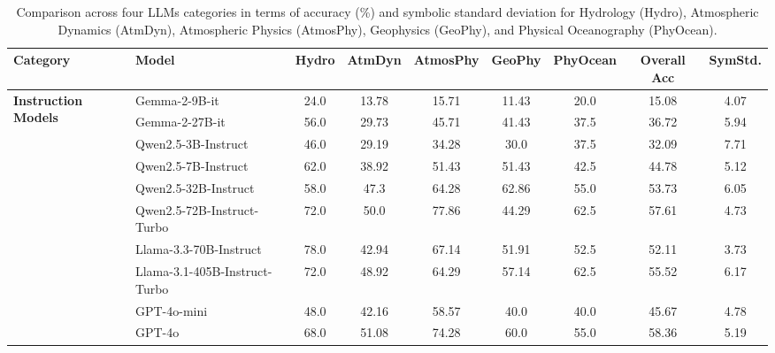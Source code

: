\begin{table*}[ht]
    \caption{Comparison across four LLMs categories in terms of accuracy (\%) and symbolic standard deviation for Hydrology (Hydro), Atmospheric Dynamics (AtmDyn), Atmospheric Physics (AtmosPhy), Geophysics (GeoPhy), and Physical Oceanography (PhyOcean).}
    \label{tab:model_comparison}
    \centering
    \large
    \begin{adjustbox}{max width=\textwidth}
    \begin{tabular}{l l c c c c c | c c}
        \toprule
        \textbf{Category} & \textbf{Model} & \textbf{Hydro} & \textbf{AtmDyn} & \textbf{AtmosPhy} & \textbf{GeoPhy} & \textbf{PhyOcean} & \textbf{Overall Acc} & \textbf{SymStd.} \\
        \midrule
        \multirow{12}{*}{\textbf{Instruction Models}} 
        & Gemma-2-9B-it & 24.0 & 13.78 & 15.71 & 11.43 & 20.0 & 15.08 & 4.07 \\
        & \cellcolor{skyblue}Gemma-2-27B-it & \cellcolor{skyblue}56.0 & \cellcolor{skyblue}29.73 & \cellcolor{skyblue}45.71 & \cellcolor{skyblue}41.43 & \cellcolor{skyblue}37.5 & \cellcolor{skyblue}36.72 & \cellcolor{skyblue}5.94 \\
        & Qwen2.5-3B-Instruct & 46.0 & 29.19 & 34.28 & 30.0 & 37.5 & 32.09 & 7.71 \\
        & \cellcolor{skyblue}Qwen2.5-7B-Instruct & \cellcolor{skyblue}62.0 & \cellcolor{skyblue}38.92 & \cellcolor{skyblue}51.43 & \cellcolor{skyblue}51.43 & \cellcolor{skyblue}42.5 & \cellcolor{skyblue}44.78 & \cellcolor{skyblue}5.12 \\
        & Qwen2.5-32B-Instruct & 58.0 & 47.3 & 64.28 & 62.86 & 55.0 & 53.73 & 6.05 \\
        & \cellcolor{skyblue}Qwen2.5-72B-Instruct-Turbo & \cellcolor{skyblue}72.0 & \cellcolor{skyblue}50.0 & \cellcolor{skyblue}77.86 & \cellcolor{skyblue}44.29 & \cellcolor{skyblue}62.5 & \cellcolor{skyblue}57.61 & \cellcolor{skyblue}4.73 \\
        & Llama-3.3-70B-Instruct & 78.0 & 42.94 & 67.14 & 51.91 & 52.5 & 52.11 & 3.73 \\
        & \cellcolor{skyblue}Llama-3.1-405B-Instruct-Turbo & \cellcolor{skyblue}72.0 & \cellcolor{skyblue}48.92 & \cellcolor{skyblue}64.29 & \cellcolor{skyblue}57.14 & \cellcolor{skyblue}62.5 & \cellcolor{skyblue}55.52 & \cellcolor{skyblue}6.17 \\
        & GPT-4o-mini & 48.0 & 42.16 & 58.57 & 40.0 & 40.0 & 45.67 & 4.78 \\
        & \cellcolor{skyblue}GPT-4o & \cellcolor{skyblue}68.0 & \cellcolor{skyblue}51.08 & \cellcolor{skyblue}74.28 & \cellcolor{skyblue}60.0 & \cellcolor{skyblue}55.0 & \cellcolor{skyblue}58.36 & \cellcolor{skyblue}5.19 \\

\end{tabular}
\end{adjustbox}
\end{table*}
